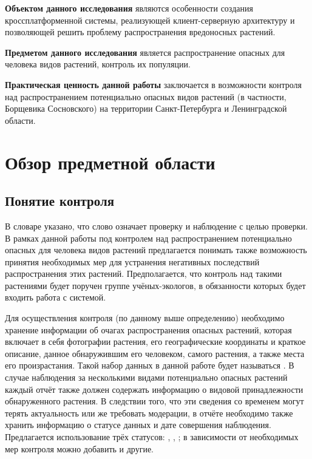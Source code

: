 \nwln
\textbf{Объектом данного исследования} являются особенности создания кроссплатформенной системы, реализующей клиент-серверную архитектуру и позволяющей решить проблему распространения вредоносных растений.

\nwln
\textbf{Предметом данного исследования} является распространение опасных для человека видов растений, контроль их популяции.

\nwln
\textbf{Практическая ценность данной работы} заключается в возможности контроля над распространением потенциально опасных видов растений (в частности, Борщевика Сосновского) на территории Санкт-Петербурга и Ленинградской области.

\section{Обзор предметной области}

\subsection{Понятие контроля}

\tab
В словаре\cite{control} указано, что слово  означает проверку и наблюдение с целью проверки.
В рамках данной работы под контролем над распространением потенциально опасных для человека видов растений предлагается понимать также возможность принятия необходимых мер для устранения негативных последствий распространения этих растений.
Предполагается, что контроль над такими растениями будет поручен группе учёных-экологов, в обязанности которых будет входить работа с системой.

\nwln
Для осуществления контроля (по данному выше определению) необходимо хранение информации об очагах распространения опасных растений, которая включает в себя фотографии растения, его географические координаты и краткое описание, данное обнаружившим его человеком, самого растения, а также места его произрастания.
Такой набор данных в данной работе будет называться .
В случае наблюдения за несколькими видами потенциально опасных растений каждый отчёт также должен содержать информацию о видовой принадлежности обнаруженного растения.
В следствии того, что эти сведения со временем могут терять актуальность или же требовать модерации, в отчёте необходимо также хранить информацию о статусе данных и дате совершения наблюдения.
Предлагается использование трёх статусов: , , ; в зависимости от необходимых мер контроля можно добавить и другие.

